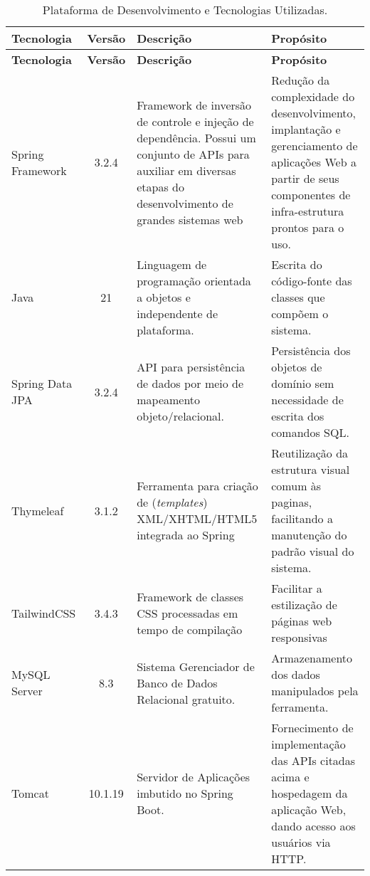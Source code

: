\begin{footnotesize}
\begin{longtable}{|p{1.8cm}|c|p{5cm}|p{6.3cm}|}
	\caption{Plataforma de Desenvolvimento e Tecnologias Utilizadas.}	
	\label{tabela-plataforma}\\\hline

	\rowcolor{lightgray}
	\textbf{Tecnologia} & \textbf{Versão} & \textbf{Descrição} & \textbf{Propósito} \\\hline 
	\endfirsthead
	\hline
	\rowcolor{lightgray}
	\textbf{Tecnologia} & \textbf{Versão} & \textbf{Descrição} & \textbf{Propósito} \\\hline 
	\endhead
		
	Spring Framework & 3.2.4 & Framework de inversão de controle e injeção de dependência. Possui um conjunto de APIs para auxiliar em diversas etapas do desenvolvimento de grandes sistemas web & Redução da complexidade do desenvolvimento, implantação e gerenciamento de aplicações Web a partir de seus componentes de infra-estrutura prontos para o uso. \\ \hline

	Java & 21 & Linguagem de programação orientada a objetos e independente de plataforma. & Escrita do código-fonte das classes que compõem o sistema. \\\hline
	
	Spring Data JPA & 3.2.4 & API para persistência de dados por meio de mapeamento objeto/relacional. & Persistência dos objetos de domínio sem necessidade de escrita dos comandos SQL. \\\hline
  
	Thymeleaf & 3.1.2 &  Ferramenta para criação de (\textit{templates}) XML/XHTML/HTML5 integrada ao Spring & Reutilização da estrutura visual comum às paginas, facilitando a manutenção do padrão visual do sistema. \\\hline

    TailwindCSS & 3.4.3 & Framework de classes CSS processadas em tempo de compilação & Facilitar a estilização de páginas web responsivas \\\hline
		
	MySQL Server & 8.3 & Sistema Gerenciador de Banco de Dados Relacional gratuito. & Armazenamento dos dados manipulados pela ferramenta. \\\hline
	
	Tomcat & 10.1.19 & Servidor de Aplicações imbutido no Spring Boot. & Fornecimento de implementação das APIs citadas acima e hospedagem da aplicação Web, dando acesso aos usuários via HTTP. \\\hline
\end{longtable}
\end{footnotesize}






